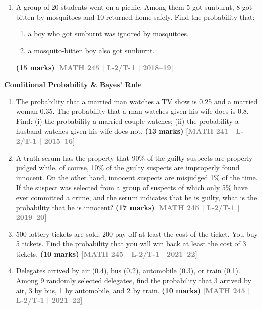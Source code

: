 \documentclass[12pt,a4paper]{article}
\newcommand{\yr}[1]{\hfill\textcolor{gray}{\small\textbf{[#1]}}}
\newcommand{\mk}[1]{\textcolor{orange!70!black}{\small\textbf{(#1 marks)}}}
\newcommand{\subtopic}[2]{%
  \vspace{10pt}
  \noindent\begin{tcolorbox}[colback=#1!8,colframe=#1,boxrule=0.6pt,arc=4pt,
    left=6pt,right=6pt,top=4pt,bottom=4pt]
    \small\bfseries\textcolor{#1}{#2}
  \end{tcolorbox}
  \vspace{2pt}
}
\begin{document}
\begin{enumerate}
\begin{center}
\end{center}
\mk{10} \yr{MATH 245 | L-2/T-1 | 2016--17}

\item A group of 20 students went on a picnic. Among them 5 got sunburnt, 8 got bitten by mosquitoes and 10 returned home safely. Find the probability that:
\begin{enumerate}
  \item a boy who got sunburnt was ignored by mosquitoes.
  \item a mosquito-bitten boy also got sunburnt.
\end{enumerate}
\mk{15} \yr{MATH 245 | L-2/T-1 | 2018--19}

\end{enumerate}

\subtopic{cG}{Conditional Probability \& Bayes' Rule}
\label{sub:s8-cond}

\begin{enumerate}

\item The probability that a married man watches a TV show is 0.25 and a married woman 0.35. The probability that a man watches given his wife does is 0.8. Find: (i) the probability a married couple watches; (ii) the probability a husband watches given his wife does not.
\mk{13} \yr{MATH 241 | L-2/T-1 | 2015--16}

\item A truth serum has the property that 90\% of the guilty suspects are properly judged while, of course, 10\% of the guilty suspects are improperly found innocent. On the other hand, innocent suspects are misjudged 1\% of the time. If the suspect was selected from a group of suspects of which only 5\%
 have ever committed a crime, and the serum indicates that he is guilty, what is the probability that he is innocent?
\mk{17} \yr{MATH 245 | L-2/T-1 | 2019--20}

\item 500 lottery tickets are sold; 200 pay off at least the cost of the ticket. You buy 5 tickets. Find the probability that you will win back at least the cost of 3 tickets.
\mk{10} \yr{MATH 245 | L-2/T-1 | 2021--22}

\item Delegates arrived by air (0.4), bus (0.2), automobile (0.3), or train (0.1). Among 9 randomly selected delegates, find the probability that 3 arrived by air, 3 by bus, 1 by automobile, and 2 by train.
\mk{10} \yr{MATH 245 | L-2/T-1 | 2021--22}

\end{enumerate}
\end{document}
